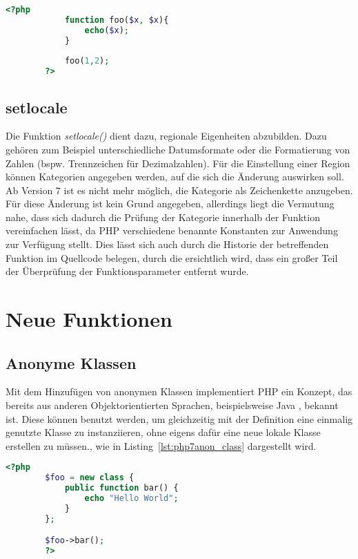     \begin{lstlisting}[language=php, caption={Beispiel meherer gleichnamiger Funktionsparameter}, label={lst:php5parameter}]
        <?php
            function foo($x, $x){
                echo($x);
            }
            
            foo(1,2);
        ?>
    \end{lstlisting}

    \subsection{setlocale}
    Die Funktion \textit{setlocale()} dient dazu, regionale Eigenheiten abzubilden. Dazu gehören zum Beispiel unterschiedliche Datumsformate oder die Formatierung von 
    Zahlen (bspw. Trennzeichen für Dezimalzahlen). Für die Einstellung einer Region können Kategorien angegeben werden, auf die sich die Änderung auswirken soll. 
    Ab Version 7 ist es nicht mehr möglich, die Kategorie als Zeichenkette anzugeben. Für diese Änderung ist kein Grund angegeben, allerdings liegt die Vermutung
    nahe, dass sich dadurch die Prüfung der Kategorie innerhalb der Funktion vereinfachen lässt, da \acs{PHP} verschiedene benannte Konstanten zur Anwendung zur Verfügung 
    stellt. Dies lässt sich auch durch die Historie der betreffenden Funktion im Quellcode belegen, durch die ersichtlich wird, dass ein großer Teil der Überprüfung
    der Funktionsparameter entfernt wurde. \cite{nikic_remove_2014}

\section{Neue Funktionen}
    \subsection{Anonyme Klassen}
    Mit dem Hinzufügen von anonymen Klassen implementiert \acs{PHP} ein Konzept, das bereits aus anderen Objektorientierten Sprachen, beispielsweise Java 
    \cite{oracle_anonymous_nodate}, bekannt ist. Diese können benutzt werden, um gleichzeitig mit der Definition eine einmalig genutzte Klasse zu instanziieren, ohne eigens 
    dafür eine neue lokale Klasse erstellen zu müssen., wie in Listing~\ref{lst:php7anon_class} dargestellt wird.

    \begin{lstlisting}[language=php, caption={Beispiel der Nutzung anonymer Klassen}, label={lst:php7anon_class}]
        <?php
        $foo = new class {
            public function bar() {
                echo "Hello World";
            }
        };

        $foo->bar();
        ?>
    \end{lstlisting}

